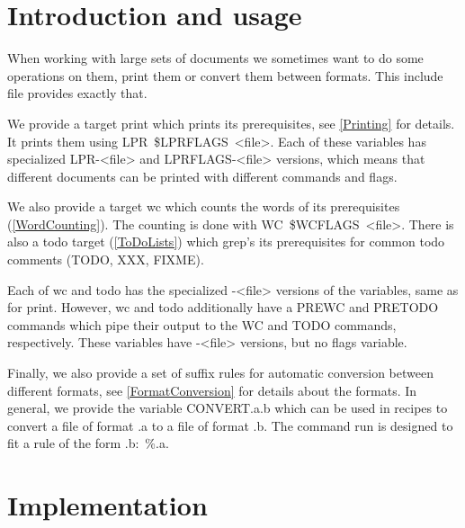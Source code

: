 \section{Introduction and usage}%

When working with large sets of documents we sometimes want to do some 
operations on them, \eg print them or convert them between formats.
This include file provides exactly that.

We provide a target {\Tt{}print\nwendquote} which prints its prerequisites, see 
\cref{Printing} for details.
It prints them using {\Tt{}{\$}{\nwlbrace}LPR{\nwrbrace}\ {\$}{\nwlbrace}LPRFLAGS{\nwrbrace}\ <file>\nwendquote}.
Each of these variables has specialized {\Tt{}LPR-<file>\nwendquote} and {\Tt{}LPRFLAGS-<file>\nwendquote} 
versions, which means that different documents can be printed with different 
commands and flags.

We also provide a target {\Tt{}wc\nwendquote} which counts the words of its prerequisites 
(\cref{WordCounting}).
The counting is done with {\Tt{}{\$}{\nwlbrace}WC{\nwrbrace}\ {\$}{\nwlbrace}WCFLAGS{\nwrbrace}\ <file>\nwendquote}.
There is also a {\Tt{}todo\nwendquote} target (\cref{ToDoLists}) which grep's its 
prerequisites for common todo comments (\eg TODO, XXX, FIXME).

Each of {\Tt{}wc\nwendquote} and {\Tt{}todo\nwendquote} has the specialized {\Tt{}-<file>\nwendquote} versions of the 
variables, same as for {\Tt{}print\nwendquote}.
However, {\Tt{}wc\nwendquote} and {\Tt{}todo\nwendquote} additionally have a {\Tt{}PREWC\nwendquote} and {\Tt{}PRETODO\nwendquote} 
commands which pipe their output to the {\Tt{}WC\nwendquote} and {\Tt{}TODO\nwendquote} commands, 
respectively.
These variables have {\Tt{}-<file>\nwendquote} versions, but no flags variable.

Finally, we also provide a set of suffix rules for automatic conversion between 
different formats, see \cref{FormatConversion} for details about the formats.
In general, we provide the variable {\Tt{}CONVERT.a.b\nwendquote} which can be used in 
recipes to convert a file of format {\Tt{}.a\nwendquote} to a file of format {\Tt{}.b\nwendquote}.
The command run is designed to fit a rule of the form {\Tt{}{\%}.b:\ {\%}.a\nwendquote}.


\section{Implementation}

